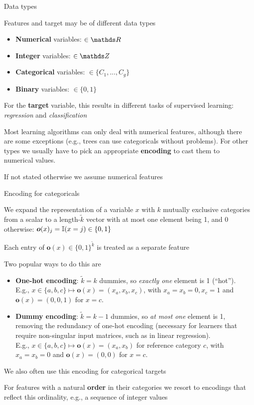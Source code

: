 \documentclass[11pt,compress,t,notes=noshow, xcolor=table]{beamer}
\begin{document}
\begin{framei}{Data types}
\item Features and target may be of different data types 
\begin{itemize}
\item \textbf{Numerical} variables: $\in \R$
\item \textbf{Integer} variables:  $\in \Z$
\item \textbf{Categorical} variables: $\in \{C_1,...,C_g\}$
\item \textbf{Binary} variables:   $\in \{0, 1\}$
\end{itemize}
\item For the \textbf{target} variable, this results in different tasks of supervised learning: \textit{regression} and \textit{classification}
\item Most learning algorithms can only deal with numerical features, although there are some exceptions (e.g., trees can use categoricals without problems).
For other types we usually have to pick an appropriate \textbf{encoding} to cast them to numerical values.
\item If not stated otherwise we assume numerical features
\end{framei}


\begin{framei}[fs=small]{Encoding for categoricals}
\item We expand the representation of a variable $x$ with $k$ mutually exclusive categories from a scalar to a length-$\tilde k$ vector with at most one element being 1, and 0 otherwise: $\bm{o}(x)_j =\mathbb{I}(x = j) \in \{0,1\}$
\item Each entry of $\bm{o}(x)\in \{0,1\}^{\tilde k}$ is treated as a separate feature
\item Two popular ways to do this are
\begin{itemize}\footnotesize
\item \textbf{One-hot encoding}: $\tilde k = k$ dummies, so \textit{exactly one} element is 1 (\enquote{hot}).
E.g., $x \in \{ a, b, c\} \mapsto \bm{o}(x) = (x_a, x_b, x_c)$, with $x_a = x_b = 0, x_c = 1$ and $\bm{o}(x) = (0, 0, 1)$ for $x = c$.
\item \textbf{Dummy encoding}: $\tilde k = k - 1$ dummies, so \textit{at most one} element is 1, removing the redundancy of one-hot encoding (necessary for learners that require non-singular input matrices, such as in linear regression). \\
E.g., $x \in \{ a, b, c\} \mapsto \bm{o}(x) = (x_a, x_b)$ for reference category $c$, with $x_a = x_b = 0$ and $\bm{o}(x) = (0, 0)$ for $x = c$.
\end{itemize}
\item We also often use this encoding for categorical targets
\item For features with a natural \textbf{order} in their categories we resort to encodings that reflect this ordinality, e.g., a sequence of integer values
\end{framei}
\end{document}
